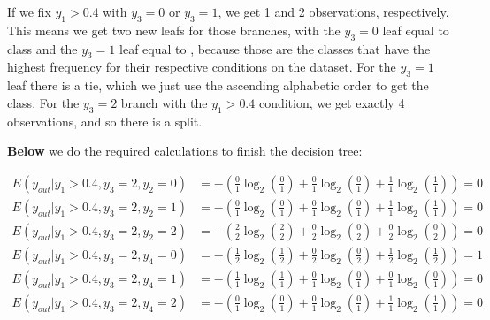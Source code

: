 \documentclass[12pt]{article}
\begin{document}
\begin{enumerate}[leftmargin=\labelsep]
        If we fix $y_1 > 0.4$ with $y_3 = 0$ or $y_3 = 1$, we get 1 and 2 observations, respectively. This means we get two new leafs for those branches, with
        the $y_3 = 0$ leaf equal to class  and the $y_3 = 1$ leaf equal to , because those are the classes that have the highest frequency for
        their respective conditions on the dataset. For the $y_3 = 1$ leaf there is a tie, which we just use the ascending alphabetic order to get the class.
        For the $y_3 = 2$ branch with the $y_1 > 0.4$ condition, we get exactly 4 observations, and so there is a split.

        \textbf{Below} we do the required calculations to finish the decision tree:

        \[
          \begin{aligned}
            E(y_{out} | y_1 > 0.4 , y_3 = 2 , y_2 = 0) & = - \left(\frac{0}{1} \log_2\left(\frac{0}{1}\right) + \frac{0}{1} \log_2\left(\frac{0}{1}\right)
            + \frac{1}{1} \log_2\left(\frac{1}{1}\right)\right) = 0                                                                                        \\
            E(y_{out} | y_1 > 0.4 , y_3 = 2 , y_2 = 1) & = - \left(\frac{0}{1} \log_2\left(\frac{0}{1}\right) + \frac{0}{1} \log_2\left(\frac{0}{1}\right)
            + \frac{1}{1} \log_2\left(\frac{1}{1}\right)\right) = 0                                                                                        \\
            E(y_{out} | y_1 > 0.4 , y_3 = 2 , y_2 = 2) & = - \left(\frac{2}{2} \log_2\left(\frac{2}{2}\right) + \frac{0}{2} \log_2\left(\frac{0}{2}\right)
            + \frac{0}{2} \log_2\left(\frac{0}{2}\right)\right) = 0                                                                                        \\
            E(y_{out} | y_1 > 0.4 , y_3 = 2 , y_4 = 0) & = - \left(\frac{1}{2} \log_2\left(\frac{1}{2}\right) + \frac{0}{2} \log_2\left(\frac{0}{2}\right)
            + \frac{1}{2} \log_2\left(\frac{1}{2}\right)\right) = 1                                                                                        \\
            E(y_{out} | y_1 > 0.4 , y_3 = 2 , y_4 = 1) & = - \left(\frac{1}{1} \log_2\left(\frac{1}{1}\right) + \frac{0}{1} \log_2\left(\frac{0}{1}\right)
            + \frac{0}{1} \log_2\left(\frac{0}{1}\right)\right) = 0                                                                                        \\
            E(y_{out} | y_1 > 0.4 , y_3 = 2 , y_4 = 2) & = - \left(\frac{0}{1} \log_2\left(\frac{0}{1}\right) + \frac{0}{1} \log_2\left(\frac{0}{1}\right)
            + \frac{1}{1} \log_2\left(\frac{1}{1}\right)\right) = 0
          \end{aligned}
        \]


\end{enumerate}
\end{document}
